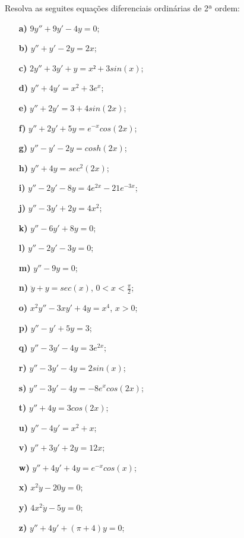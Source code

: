 \linespread{1.5}
Resolva as seguites equações diferenciais ordinárias de 2ª ordem:
\begin{itemize}
    \item[\textbf{a)}] $9y'' + 9y' - 4y=0$;
    \item[\textbf{b)}] $y''+y'-2y=2x$;
    \item[\textbf{c)}] $2y''+3y'+y=x² + 3sin(x)$;
    \item[\textbf{d)}] $y'' + 4y' = x^2 + 3e^x$;
    \item[\textbf{e)}] $y'' + 2y' = 3 + 4sin(2x)$;
    \item[\textbf{f)}] $y'' + 2y' + 5y = e^{-x}cos(2x)$;
    \item[\textbf{g)}] $y'' - y' - 2y = cosh(2x)$;
    \item[\textbf{h)}] $y'' + 4y = sec^2(2x)$;
    \item[\textbf{i)}] $y'' - 2y' - 8y = 4e^{2x} - 21e^{-3x}$;
    \item[\textbf{j)}] $y'' - 3y' + 2y = 4x^2$;
    \item[\textbf{k)}] $y'' - 6y' + 8y = 0$;
    \item[\textbf{l)}] $y'' - 2y' - 3y = 0$;
    \item[\textbf{m)}] $y'' - 9y = 0$;
    \item[\textbf{n)}] $\ddot{y} + y = sec(x)$, $0 < x < \frac{\pi}{2}$;
    \item[\textbf{o)}] $x^2y'' - 3xy' + 4y = x^4$, $x>0$;
    \item[\textbf{p)}] $y'' - y' + 5y = 3$;
    \item[\textbf{q)}] $y'' - 3y' - 4y = 3e^{2x}$;
    \item[\textbf{r)}] $y'' - 3y' - 4y = 2sin(x)$;
    \item[\textbf{s)}] $y'' - 3y' - 4y = -8e^xcos(2x)$;
    \item[\textbf{t)}] $y'' + 4y = 3cos(2x)$;
    \item[\textbf{u)}] $y'' - 4y' = x^2 + x$;
    \item[\textbf{v)}] $y'' + 3y' + 2y = 12x$;
    \item[\textbf{w)}] $y'' + 4y' + 4y = e^{-x}cos(x)$;
    \item[\textbf{x)}] $x^2\ddot{y} - 20y = 0$;
    \item[\textbf{y)}] $4x^2\ddot{y} - 5y = 0$;
    \item[\textbf{z)}] $y'' + 4y' + (\pi + 4)y = 0$;
\end{itemize}